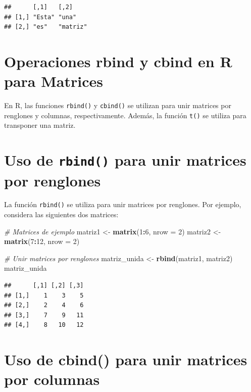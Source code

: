 \documentclass[
]{book}
\newenvironment{Shaded}{\begin{snugshade}}{\end{snugshade}}
\newcommand{\AttributeTok}[1]{\textcolor[rgb]{0.13,0.29,0.53}{#1}}
\newcommand{\CommentTok}[1]{\textcolor[rgb]{0.56,0.35,0.01}{\textit{#1}}}
\newcommand{\DecValTok}[1]{\textcolor[rgb]{0.00,0.00,0.81}{#1}}
\newcommand{\FunctionTok}[1]{\textcolor[rgb]{0.13,0.29,0.53}{\textbf{#1}}}
\newcommand{\NormalTok}[1]{#1}
\newcommand{\OtherTok}[1]{\textcolor[rgb]{0.56,0.35,0.01}{#1}}
\newcommand{\SpecialCharTok}[1]{\textcolor[rgb]{0.81,0.36,0.00}{\textbf{#1}}}
\begin{document}
\begin{verbatim}
##      [,1]   [,2]    
## [1,] "Esta" "una"   
## [2,] "es"   "matriz"
\end{verbatim}

\section{Operaciones rbind y cbind en R para Matrices}\label{operaciones-rbind-y-cbind-en-r-para-matrices}

En R, las funciones \texttt{rbind()} y \texttt{cbind()} se utilizan para unir matrices por renglones y columnas, respectivamente. Además, la función \texttt{t()} se utiliza para transponer una matriz.

\section{\texorpdfstring{Uso de \texttt{rbind()} para unir matrices por renglones}{Uso de rbind() para unir matrices por renglones}}\label{uso-de-rbind-para-unir-matrices-por-renglones}

La función \texttt{rbind()} se utiliza para unir matrices por renglones. Por ejemplo, considera las siguientes dos matrices:

\begin{Shaded}
\begin{Highlighting}[]
\CommentTok{\# Matrices de ejemplo}
\NormalTok{matriz1 }\OtherTok{\textless{}{-}} \FunctionTok{matrix}\NormalTok{(}\DecValTok{1}\SpecialCharTok{:}\DecValTok{6}\NormalTok{, }\AttributeTok{nrow =} \DecValTok{2}\NormalTok{)}
\NormalTok{matriz2 }\OtherTok{\textless{}{-}} \FunctionTok{matrix}\NormalTok{(}\DecValTok{7}\SpecialCharTok{:}\DecValTok{12}\NormalTok{, }\AttributeTok{nrow =} \DecValTok{2}\NormalTok{)}

\CommentTok{\# Unir matrices por renglones}
\NormalTok{matriz\_unida }\OtherTok{\textless{}{-}} \FunctionTok{rbind}\NormalTok{(matriz1, matriz2)}
\NormalTok{matriz\_unida}
\end{Highlighting}
\end{Shaded}

\begin{verbatim}
##      [,1] [,2] [,3]
## [1,]    1    3    5
## [2,]    2    4    6
## [3,]    7    9   11
## [4,]    8   10   12
\end{verbatim}

\section{Uso de cbind() para unir matrices por columnas}\label{uso-de-cbind-para-unir-matrices-por-columnas}
\end{document}
